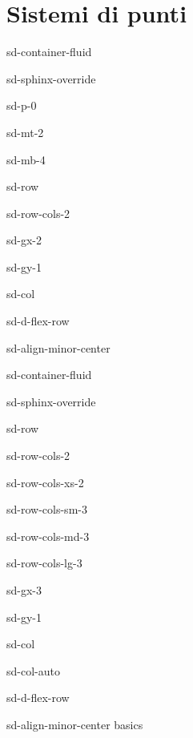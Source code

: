 \documentclass[letterpaper,10pt,english]{jupyterBook}
\begin{document}
\section{Sistemi di punti}
\label{\detokenize{ch/lagrange-points:sistemi-di-punti}}\label{\detokenize{ch/lagrange-points:classical-mechanics-lagrange-points}}\label{\detokenize{ch/lagrange-points::doc}}
\sphinxstepscope

\begin{sphinxuseclass}{sd-container-fluid}
\begin{sphinxuseclass}{sd-sphinx-override}
\begin{sphinxuseclass}{sd-p-0}
\begin{sphinxuseclass}{sd-mt-2}
\begin{sphinxuseclass}{sd-mb-4}
\begin{sphinxuseclass}{sd-row}
\begin{sphinxuseclass}{sd-row-cols-2}
\begin{sphinxuseclass}{sd-gx-2}
\begin{sphinxuseclass}{sd-gy-1}
\begin{sphinxuseclass}{sd-col}
\begin{sphinxuseclass}{sd-d-flex-row}
\begin{sphinxuseclass}{sd-align-minor-center}
\begin{sphinxuseclass}{sd-container-fluid}
\begin{sphinxuseclass}{sd-sphinx-override}
\begin{sphinxuseclass}{sd-row}
\begin{sphinxuseclass}{sd-row-cols-2}
\begin{sphinxuseclass}{sd-row-cols-xs-2}
\begin{sphinxuseclass}{sd-row-cols-sm-3}
\begin{sphinxuseclass}{sd-row-cols-md-3}
\begin{sphinxuseclass}{sd-row-cols-lg-3}
\begin{sphinxuseclass}{sd-gx-3}
\begin{sphinxuseclass}{sd-gy-1}
\begin{sphinxuseclass}{sd-col}
\begin{sphinxuseclass}{sd-col-auto}
\begin{sphinxuseclass}{sd-d-flex-row}
\begin{sphinxuseclass}{sd-align-minor-center}
\sphinxAtStartPar
basics


\end{sphinxuseclass}
\end{sphinxuseclass}
\end{sphinxuseclass}
\end{sphinxuseclass}
\end{sphinxuseclass}
\end{sphinxuseclass}
\end{sphinxuseclass}
\end{sphinxuseclass}
\end{sphinxuseclass}
\end{sphinxuseclass}
\end{sphinxuseclass}
\end{sphinxuseclass}
\end{sphinxuseclass}
\end{sphinxuseclass}
\end{sphinxuseclass}
\end{sphinxuseclass}
\end{sphinxuseclass}
\end{sphinxuseclass}
\end{sphinxuseclass}
\end{sphinxuseclass}
\end{sphinxuseclass}
\end{sphinxuseclass}
\end{sphinxuseclass}
\end{sphinxuseclass}
\end{sphinxuseclass}
\end{sphinxuseclass}
\end{document}
